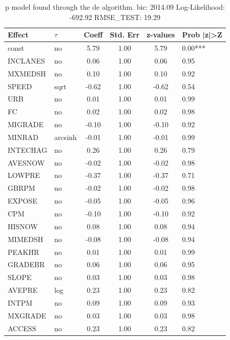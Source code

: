 \begin{table}
	\caption{p model found through the de algorithm. bic: 2014.09 Log-Likelihood: -692.92 RMSE_TEST: 19.29}
	\begin{center}
		\begin{tabular}{|l|l|c|c|c|l|}
			\hline
			Effect & $\tau$ & Coeff & Std. Err & z-values & Prob |z|>Z \\
			\hline
			const & no & 5.79 & 1.00 & 5.79 & 0.00*** \\
			\hline
			INCLANES & no & 0.06 & 1.00 & 0.06 & 0.95 \\
			\hline
			MXMEDSH & no & 0.10 & 1.00 & 0.10 & 0.92 \\
			\hline
			SPEED & sqrt & -0.62 & 1.00 & -0.62 & 0.54 \\
			\hline
			URB & no & 0.01 & 1.00 & 0.01 & 0.99 \\
			\hline
			FC & no & 0.02 & 1.00 & 0.02 & 0.98 \\
			\hline
			MIGRADE & no & -0.10 & 1.00 & -0.10 & 0.92 \\
			\hline
			MINRAD & arcsinh & -0.01 & 1.00 & -0.01 & 0.99 \\
			\hline
			INTECHAG & no & 0.26 & 1.00 & 0.26 & 0.79 \\
			\hline
			AVESNOW & no & -0.02 & 1.00 & -0.02 & 0.98 \\
			\hline
			LOWPRE & no & -0.37 & 1.00 & -0.37 & 0.71 \\
			\hline
			GBRPM & no & -0.02 & 1.00 & -0.02 & 0.98 \\
			\hline
			EXPOSE & no & -0.05 & 1.00 & -0.05 & 0.96 \\
			\hline
			CPM & no & -0.10 & 1.00 & -0.10 & 0.92 \\
			\hline
			HISNOW & no & 0.08 & 1.00 & 0.08 & 0.94 \\
			\hline
			MIMEDSH & no & -0.08 & 1.00 & -0.08 & 0.94 \\
			\hline
			PEAKHR & no & 0.01 & 1.00 & 0.01 & 0.99 \\
			\hline
			GRADEBR & no & 0.06 & 1.00 & 0.06 & 0.95 \\
			\hline
			SLOPE & no & 0.03 & 1.00 & 0.03 & 0.98 \\
			\hline
			AVEPRE & log & 0.23 & 1.00 & 0.23 & 0.82 \\
			\hline
			INTPM & no & 0.09 & 1.00 & 0.09 & 0.93 \\
			\hline
			MXGRADE & no & 0.03 & 1.00 & 0.03 & 0.98 \\
			\hline
			ACCESS & no & 0.23 & 1.00 & 0.23 & 0.82 \\

\end{tabular}
\end{center}
\end{table}
